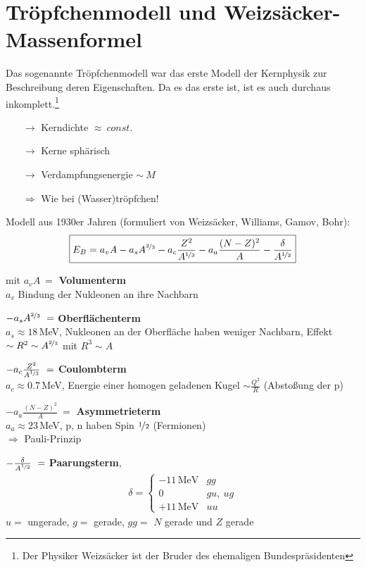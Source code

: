 \section{Tröpfchenmodell und Weizsäcker-Massenformel}
Das sogenannte Tröpfchenmodell war das erste Modell der Kernphysik zur Beschreibung deren Eigenschaften. Da es das erste ist, ist es auch durchaus inkomplett.\footnote{Der Physiker Weizsäcker ist der Bruder des ehemaligen Bundespräsidenten}

\begin{itemize}
\item[$\rightarrow$] Kerndichte $\approx \ const.$
\item[$\rightarrow$] Kerne sphärisch
\item[$\rightarrow$] \glqq Verdampfungsenergie\grqq{} $\sim \ M$
\item[$\Rightarrow$] Wie bei (Wasser)tröpfchen!
\end{itemize}
Modell aus 1930er Jahren (formuliert von Weizsäcker, Williams, Gamov, Bohr):
\begin{align}
\boxed{ E_B = a_v A - a_s A^{\nicefrac{2}{3}} - a_c \frac{Z^2}{A^{\nicefrac{1}{3}}} - a_a \frac{(N-Z)^2}{A} - \frac{\delta}{A^{\nicefrac{1}{2}}}}
\end{align}
\begin{compactitem}
\item[mit] $a_vA \ =$ \textbf{Volumenterm}\\
$a_v$ Bindung der Nukleonen an ihre Nachbarn
\item[] $-a_sA^{\nicefrac{2}{3}}\ = $ \textbf{Oberflächenterm}\\
$a_s \approx 18\,$MeV, Nukleonen an der Oberfläche haben weniger Nachbarn, Effekt $\sim R^2 \sim A^{\nicefrac{2}{3}}$ mit $R^3 \sim A$
\item[] $-a_c \frac{Z^2}{A^{\nicefrac{1}{3}}} \ =$ \textbf{Coulombterm}\\
$a_c \approx 0.7\,$MeV, Energie einer homogen geladenen Kugel $\sim \frac{Q^2}{R}$ (Abstoßung der p)
\item[] $-a_a\frac{(N-Z)^2}{A}\ = $ \textbf{Asymmetrieterm}\\
$a_a \approx 23$\,MeV, p, n haben Spin $\nicefrac{1}{2}$ (Fermionen)\\
$\Rightarrow$ Pauli-Prinzip
\item[] $-\frac{\delta}{A^{\nicefrac{1}{2}}} \ =$ \textbf{Paarungsterm},
\begin{align}
\delta = \left\lbrace \begin{matrix} -11\,\mathrm{MeV}& gg\\ 0 & gu,\ ug\\ +11\,\mathrm{MeV} & uu \end{matrix}\right.
\end{align}
$u=$ ungerade, $g=$ gerade, $gg=$ $N$ gerade und $Z$ gerade
\end{compactitem}

